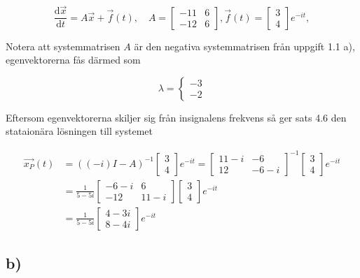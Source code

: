 \documentclass[a4paper]{article}
\newcommand{\mat}[1]{\bm{\mathit{#1}}}
\begin{document}
\begin{equation*}
  \frac{\text{d}\vec{x}}{\text{d}t} = \mat{A}\vec{x} + \vec{f}(t), \quad \mat{A} = \begin{bmatrix}-11 & 6\\-12 & 6\end{bmatrix}, \vec{f}(t) = \begin{bmatrix}3\\4\end{bmatrix}e^{-it},
\end{equation*}

\noindent Notera att systemmatrisen $\mat{A}$ är den negativa systemmatrisen
från uppgift 1.1 a), egenvektorerna fås därmed som

\begin{equation*}
  \lambda = \begin{cases}-3\\-2\end{cases}
\end{equation*}

\noindent Eftersom egenvektorerna skiljer sig från insignalens frekvens så ger
sats 4.6 den stataionära lösningen till systemet

\begin{align*}
  \vec{x_P}(t) &= ((-i)\mat{I} - \mat{A})^{-1}\begin{bmatrix}3\\4\end{bmatrix}e^{-it} = \begin{bmatrix}11-i & -6\\12 & -6-i\end{bmatrix}^{-1}\begin{bmatrix}3\\4\end{bmatrix}e^{-it}\\[2ex]
  &= \frac{1}{5-5i}\begin{bmatrix}-6-i & 6\\ -12& 11 - i\end{bmatrix}\begin{bmatrix}3\\4\end{bmatrix}e^{-it}\\[2ex]
  &= \frac{1}{5-5i}\begin{bmatrix}4-3i\\8-4i\end{bmatrix}e^{-it}
\end{align*}

\subsection*{b)}
\end{document}
